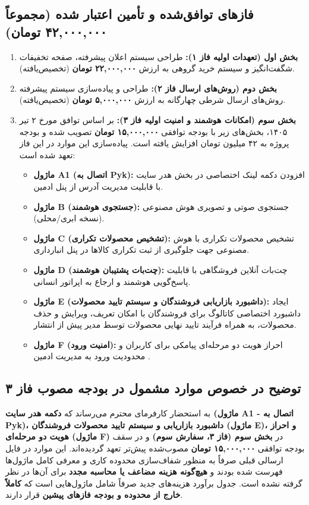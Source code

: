 \documentclass[11pt,a4paper]{article}
\begin{document}
\subsection{فازهای توافق‌شده و تأمین اعتبار شده (مجموعاً ۴۲,۰۰۰,۰۰۰ تومان)}
\begin{enumerate}
    \item \textbf{بخش اول (تعهدات اولیه فاز ۱):} طراحی سیستم اعلان پیشرفته، صفحه تخفیفات شگفت‌انگیز و سیستم خرید گروهی به ارزش \textbf{۲۲,۰۰۰,۰۰۰ تومان} (تخصیص‌یافته).
    \item \textbf{بخش دوم (روش‌های ارسال فاز ۲):} طراحی و پیاده‌سازی سیستم پیشرفته روش‌های ارسال شرطی چهارگانه  به ارزش \textbf{۵,۰۰۰,۰۰۰ تومان} (تخصیص‌یافته).
    \item \textbf{بخش سوم (امکانات هوشمند و امنیت اولیه فاز ۳):} بر اساس توافق مورخ ۲ تیر ۱۴۰۵، بخش‌های زیر با بودجه توافقی \textbf{۱۵,۰۰۰,۰۰۰ تومان} تصویب شده و بودجه پروژه به ۴۲ میلیون تومان افزایش یافته است. پیاده‌سازی این موارد در این فاز تعهد شده است:
    \begin{itemize}
        \item \textbf{ماژول A1 (اتصال به Pyk):} افزودن دکمه لینک اختصاصی در بخش هدر سایت با قابلیت مدیریت آدرس از پنل ادمین.
        \item \textbf{ماژول B (جستجوی هوشمند):} جستجوی صوتی و تصویری هوش مصنوعی (نسخه ابری/محلی).
        \item \textbf{ماژول C (تشخیص محصولات تکراری):} تشخیص محصولات تکراری با هوش مصنوعی جهت جلوگیری از ثبت تکراری کالاها در پنل انبارداری.
        \item \textbf{ماژول D (چت‌بات پشتیبان هوشمند):} چت‌بات آنلاین فروشگاهی با قابلیت پاسخ‌گویی هوشمند و ارجاع به اپراتور انسانی.
        \item \textbf{ماژول E (داشبورد بازاریابی فروشندگان و سیستم تایید محصولات):} ایجاد داشبورد اختصاصی کاتالوگ برای فروشندگان با امکان تعریف، ویرایش و حذف محصولات، به همراه فرآیند تایید نهایی محصولات توسط مدیر پیش از انتشار.
        \item \textbf{ماژول F (امنیت ورود):} احراز هویت دو مرحله‌ای پیامکی  برای کاربران و محدودیت ورود به مدیریت ادمین .
    \end{itemize}
\end{enumerate}

\subsection{توضیح در خصوص موارد مشمول در بودجه مصوب فاز ۳}
به استحضار کارفرمای محترم می‌رساند که \textbf{دکمه هدر سایت (ماژول A1 - اتصال به Pyk)، داشبورد بازاریابی و سیستم تایید محصولات فروشندگان (ماژول E)، و احراز هویت دو مرحله‌ای (ماژول F)} در \textbf{بخش سوم (فاز ۳، سفارش سوم)} و در سقف بودجه توافقی \textbf{۱۵,۰۰۰,۰۰۰ تومان} مصوب‌شده پیش‌تر تعهد گردیده‌اند. این موارد در فایل ارسالی قبلی صرفاً به منظور شفاف‌سازی محدوده کاری و معرفی کامل ماژول‌ها فهرست شده بودند و \textbf{هیچ‌گونه هزینه مضاعف یا محاسبه مجدد} برای آن‌ها در نظر گرفته نشده است. جدول برآورد هزینه‌های جدید صرفاً شامل ماژول‌هایی است که \textbf{کاملاً خارج از محدوده و بودجه فازهای پیشین} قرار دارند.
\end{document}
